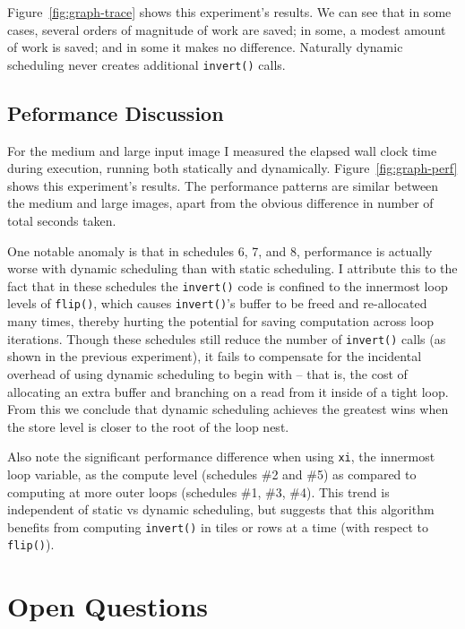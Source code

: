 \documentclass{article}
\begin{document}
Figure~\ref{fig:graph-trace} shows this experiment's results. We can see that in some cases, several orders of magnitude of work are saved; in some, a modest amount of work is saved; and in some it makes no difference. Naturally dynamic scheduling never creates additional \texttt{invert()} calls.

\subsection{Peformance Discussion}

For the medium and large input image I measured the elapsed wall clock time during execution, running both statically and dynamically. Figure~\ref{fig:graph-perf} shows this experiment's results. The performance patterns are similar between the medium and large images, apart from the obvious difference in number of total seconds taken.

One notable anomaly is that in schedules 6, 7, and 8, performance is actually worse with dynamic scheduling than with static scheduling. I attribute this to the fact that in these schedules the \texttt{invert()} code is confined to the innermost loop levels of \texttt{flip()}, which causes \texttt{invert()}'s buffer to be freed and re-allocated many times, thereby hurting the potential for saving computation across loop iterations.
Though these schedules still reduce the number of \texttt{invert()} calls (as shown in the previous experiment), it fails to compensate for the incidental overhead of using dynamic scheduling to begin with -- that is, the cost of allocating an extra buffer and branching on a read from it inside of a tight loop. From this we conclude that dynamic scheduling achieves the greatest wins when the store level is closer to the root of the loop nest.

Also note the significant performance difference when using \texttt{xi}, the innermost loop variable, as the compute level (schedules \#2 and \#5) as compared to computing at more outer loops (schedules \#1, \#3, \#4). This trend is independent of static vs dynamic scheduling, but suggests that this algorithm benefits from computing \texttt{invert()} in tiles or rows at a time (with respect to \texttt{flip()}).

\section{Open Questions}
\label{sec:future-tiles}
\end{document}
